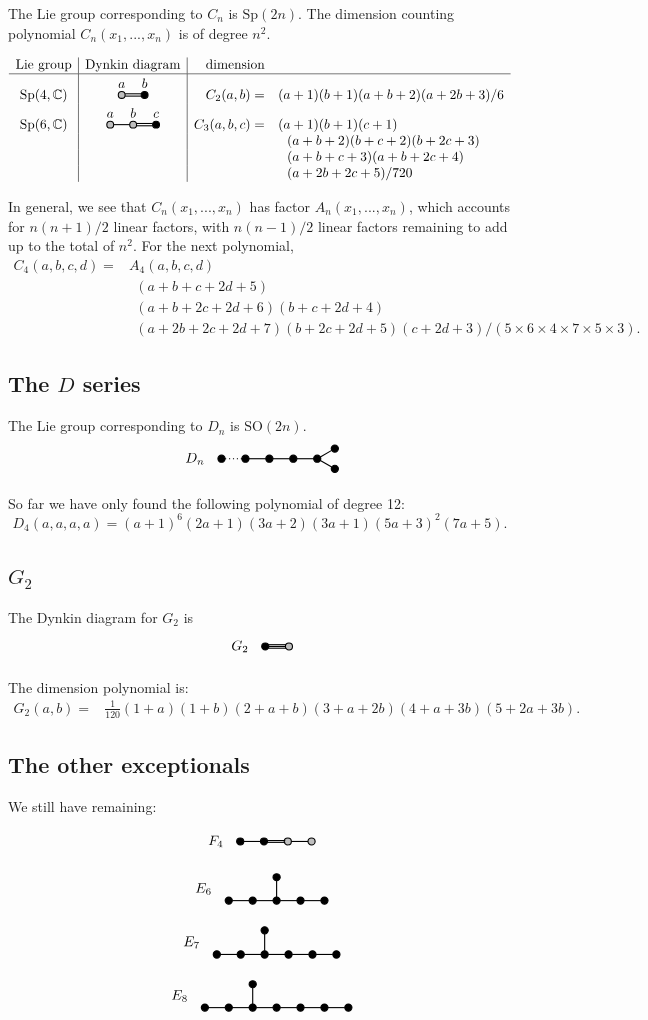 \documentclass[11pt,oneside]{article}
\newcommand{\Complex}{\mathbb{C}}
\newcommand{\SO}{\mathrm{SO}}
\newcommand{\Sp}{\mathrm{Sp}}
\begin{document}
The Lie group corresponding to $C_n$ is $\Sp(2n).$
The dimension counting polynomial $C_n(x_1,...,x_n)$ is
of degree $n^2.$

$$
\begin{array}{c|c|rl}
\text{Lie group} & \text{Dynkin diagram} & \text{dimension} & \\
\hline
\Sp(4,\Complex) & \DynkinCab  & C_2(a,b) =& (a+1)(b+1)(a+b+2)(a+2b+3)/6 \\
\Sp(6,\Complex) & \DynkinCabc & C_3(a,b,c) =& (a+1)(b+1)(c+1) \\
                             & & &\ \ (a+b+2)(b+c+2)(b+2c+3)\\
                             & & &\ \ (a+b+c+3)(a+b+2c+4)\\
            & & &\ \ (a+2b+2c+5)/720 \\
\end{array}
$$

In general, we see that $C_n(x_1,...,x_n)$ has factor $A_n(x_1,...,x_n)$,
which accounts for $n(n+1)/2$ linear factors, with $n(n-1)/2$ linear
factors remaining to add up to the total of $n^2$.
For the next polynomial,
\begin{align*}
C_4(a, b, c, d) =& A_4(a, b, c, d) \\
    &\ \  (a+b+c+2d+5) \\
    &\ \  (a+b+2c+2d+6)(b+c+2d+4) \\
    &\ \  (a+2b+2c+2d+7)(b+2c+2d+5)(c+2d+3)/(5\times 6\times 4\times 7\times 5\times 3).
\end{align*}

\subsection{The $D$ series}

The Lie group corresponding to $D_n$ is $\SO(2n).$
$$
\DynkinDn
$$

So far we have only found the following polynomial of degree 12:
$$
D_4(a, a, a, a) = (a+1)^6(2a+1)(3a+2)(3a+1)(5a+3)^2(7a+5).
$$

\subsection{$G_2$}

The Dynkin diagram for $G_2$ is
$$
\DynkinGtwo
$$

The dimension polynomial is:
\begin{align*}
G_2(a, b) =& \frac{1}{120} (1+a)(1+b)(2+a+b)(3+a+2b)(4+a+3b)(5+2a+3b).
\end{align*}

\subsection{The other exceptionals}

We still have remaining: %

$$
\DynkinFfour
$$

$$
\DynkinEsix
$$

$$
\DynkinEseven
$$

$$
\DynkinEeight
$$


{}

\end{document}
